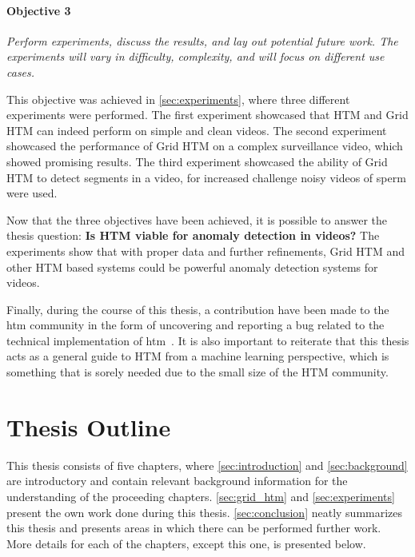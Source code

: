 \paragraph*{Objective 3} \emph{Perform experiments, discuss the results, and lay out potential future work. The experiments will vary in difficulty, complexity, and will focus on different use cases.}
\par
This objective was achieved in \autoref{sec:experiments}, where three different experiments were performed. The first experiment showcased that HTM and Grid HTM can indeed perform on simple and clean videos. The second experiment showcased the performance of Grid HTM on a complex surveillance video, which showed promising results. The third experiment showcased the ability of Grid HTM to detect segments in a video, for increased challenge noisy videos of sperm were used.
\par
Now that the three objectives have been achieved, it is possible to answer the thesis question: \textbf{Is HTM viable for anomaly detection in videos?} The experiments show that with proper data and further refinements, Grid HTM and other HTM based systems could be powerful anomaly detection systems for videos.
\par
Finally, during the course of this thesis, a contribution have been made to the  \gls*{htm} community in the form of uncovering and reporting a bug related to the technical implementation of  \gls*{htm}~\cite{github_contrib}. It is also important to reiterate that this thesis acts as a general guide to HTM from a machine learning perspective, which is something that is sorely needed due to the small size of the HTM community.

\section{Thesis Outline}
This thesis consists of five chapters, where \autoref{sec:introduction} and \autoref{sec:background} are introductory and contain relevant background information for the understanding of the proceeding chapters. \autoref{sec:grid_htm} and \autoref{sec:experiments} present the own work done during this thesis. \autoref{sec:conclusion} neatly summarizes this thesis and presents areas in which there can be performed further work. More details for each of the chapters, except this one, is presented below.
\par
